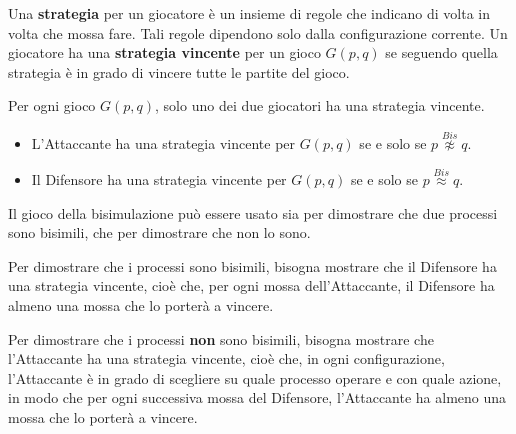 Una \textbf{strategia} per un giocatore è un insieme di regole che indicano di
volta in volta che mossa fare. Tali regole dipendono solo dalla configurazione
corrente. Un giocatore ha una \textbf{strategia vincente} per un gioco $G(p, q)$
se seguendo quella strategia è in grado di vincere tutte le partite del gioco.
\begin{teorema}
    Per ogni gioco $G(p, q)$, solo uno dei due giocatori ha una strategia vincente.
    \begin{itemize}
        \item L'Attaccante ha una strategia vincente per $G(p, q)$ se e solo se
              $p \stackrel{Bis}{\not\approx} q$.
        \item Il Difensore ha una strategia vincente per $G(p, q)$ se e solo se
              $p \stackrel{Bis}{\approx} q$.
    \end{itemize}
\end{teorema}
\begin{nota}
    Il gioco della bisimulazione può essere usato sia per dimostrare che due
    processi sono bisimili, che per dimostrare che non lo sono.
\end{nota}
Per dimostrare che i processi sono bisimili, bisogna mostrare che il Difensore
ha una strategia vincente, cioè che, per ogni mossa dell'Attaccante, il Difensore
ha almeno una mossa che lo porterà a vincere.

Per dimostrare che i processi \textbf{non} sono bisimili, bisogna mostrare che
l'Attaccante ha una strategia vincente, cioè che, in ogni configurazione,
l'Attaccante è in grado di scegliere su quale processo operare e con quale azione,
in modo che per ogni successiva mossa del Difensore, l'Attaccante ha almeno una
mossa che lo porterà a vincere.